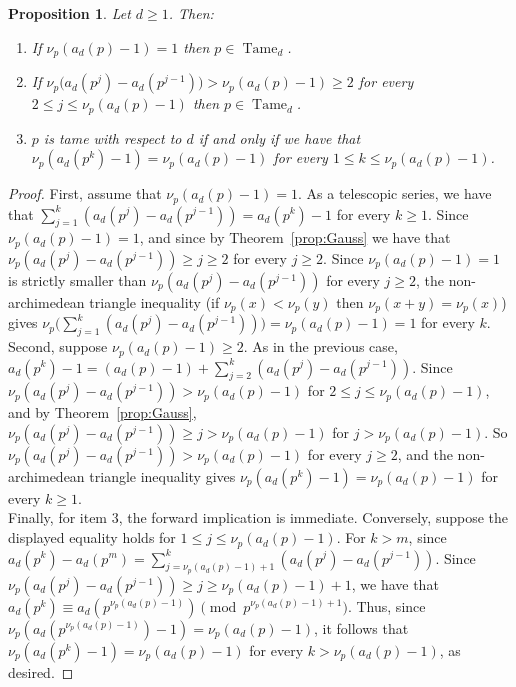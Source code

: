 \documentclass{article}
\theoremstyle{plain}
\newtheorem{proposition}[theorem]{Proposition}
\theoremstyle{definition}
\theoremstyle{remark}
\DeclareMathOperator{\Tame}{Tame}
\begin{document}
\begin{proposition}\label{prop:tame_iff}
Let $d\geq1$. Then:
\begin{enumerate}
    \item If $\nu_p(a_d(p)-1)=1$ then $p \in \Tame_d$.
    \item If $\nu_p\big(a_d(p^j)-a_d(p^{j-1})\big) > \nu_p(a_d(p)-1) \geq 2$ for every $2\le j\le \nu_p(a_d(p)-1)$ then $p \in \Tame_d$. 
    \item $p$ is tame with respect to $d$ if and only if we have that  $\nu_p(a_d(p^k)-1)= \nu_p(a_d(p)-1)$ for every $1\le k\le \nu_p(a_d(p)-1)$.
\end{enumerate}
\end{proposition}
\begin{proof}
First, assume that $\nu_p(a_d(p)-1)=1$. As a telescopic series, we have that $\sum_{j=1}^k (a_d(p^j)-a_d(p^{j-1}))=a_d(p^k)-1$ for every $k\ge1$. Since $\nu_p(a_d(p)-1)=1$, and since by Theorem~\ref{prop:Gauss} we have that $\nu_p(a_d(p^j)-a_d(p^{j-1}))\ge j\ge2$ for every $j\ge2$. Since $\nu_p(a_d(p)-1)=1$ is strictly smaller than $\nu_p(a_d(p^j)-a_d(p^{j-1}))$ for every $j\ge2$, the non-archimedean triangle inequality (if $\nu_p(x)<\nu_p(y)$ then $\nu_p(x+y)=\nu_p(x)$) gives $\nu_p\big(\sum_{j=1}^k(a_d(p^j)-a_d(p^{j-1}))\big)=\nu_p(a_d(p)-1)=1$ for every $k$.\\ 

Second, suppose $\nu_p(a_d(p)-1) \ge2$. As in the previous case,  $a_d(p^k)-1= (a_d(p)-1) +  \sum_{j=2}^k(a_d(p^j)-a_d(p^{j-1}))$. Since $\nu_p(a_d(p^j)-a_d(p^{j-1}))>\nu_p(a_d(p)-1)$ for $2\le j\le \nu_p(a_d(p)-1)$, and by Theorem~\ref{prop:Gauss}, $\nu_p(a_d(p^j)-a_d(p^{j-1}))\ge j>\nu_p(a_d(p)-1) $ for $j>\nu_p(a_d(p)-1)$. So $\nu_p(a_d(p^j)-a_d(p^{j-1}))>\nu_p(a_d(p)-1)$ for every $j\ge2$, and the non-archimedean triangle inequality gives $\nu_p(a_d(p^k)-1)=\nu_p(a_d(p)-1)$ for every $k\ge1$.\\

Finally, for item 3, the forward implication is immediate. Conversely, suppose the displayed equality holds for $1\le j\le \nu_p(a_d(p)-1)$. For $k>m$, since $a_d(p^k)-a_d(p^m)= \sum_{j=\nu_p(a_d(p)-1)+1}^{k}(a_d(p^j)-a_d(p^{j-1}))$. Since $\nu_p(a_d(p^j)-a_d(p^{j-1}))\ge j\ge \nu_p(a_d(p)-1)+1$, we have that $a_d(p^k)\equiv a_d(p^{\nu_p(a_d(p)-1)})\pmod{p^{\nu_p(a_d(p)-1)+1}}$. Thus, since $\nu_p(a_d(p^{\nu_p(a_d(p)-1)})-1)=\nu_p(a_d(p)-1)$, it follows that $\nu_p(a_d(p^k)-1)=\nu_p(a_d(p)-1)$ for every $k>\nu_p(a_d(p)-1)$, as desired. 
\end{proof}
\end{document}
